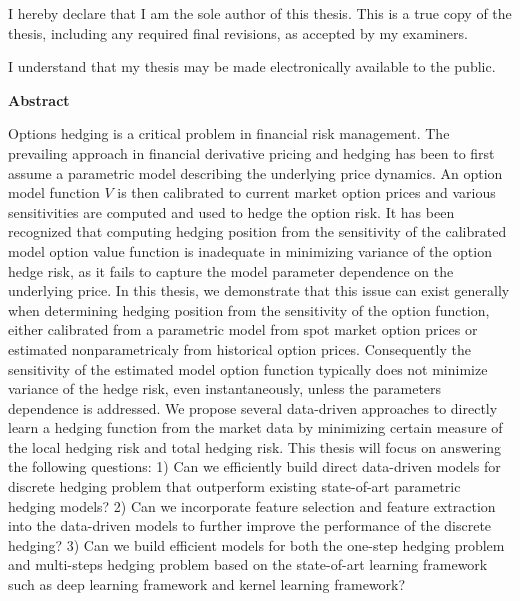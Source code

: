
\cleardoublepage

  \noindent
I hereby declare that I am the sole author of this thesis. This is a true copy of the thesis, including any required final revisions, as accepted by my examiners.

  \bigskip

  \noindent
I understand that my thesis may be made electronically available to the public.

\cleardoublepage


\begin{center}\textbf{Abstract}\end{center}
Options hedging is a critical problem in financial risk management. The prevailing approach in financial derivative pricing and hedging has been to first assume a parametric model describing the underlying price dynamics.  An option model function $V$ is then calibrated to current  market option prices and various sensitivities are computed and  used to hedge the option risk.  It has been recognized that computing hedging position from the sensitivity of the calibrated model option value function is inadequate in minimizing variance of the option hedge risk, as it fails to capture the model parameter dependence on the underlying price.
In this thesis, we demonstrate that this issue can exist generally when determining hedging position from the sensitivity of the option function, either  calibrated from a parametric model from spot market option prices or estimated nonparametricaly from historical option prices. Consequently the sensitivity of the estimated model option function typically does not minimize variance of the hedge risk, even instantaneously, unless the parameters dependence is addressed. We propose several data-driven approaches to directly learn a hedging function from the market data by minimizing certain measure of the local hedging risk and total hedging risk. This thesis will focus on answering the following questions: 1) Can we efficiently build direct data-driven models for discrete hedging problem that outperform existing state-of-art parametric hedging models? 2) Can we incorporate feature selection and feature extraction into the data-driven models to further improve the performance of the discrete hedging? 3) Can we build efficient models for both the one-step hedging problem and multi-steps hedging problem based on the state-of-art learning framework such as deep learning framework and kernel learning framework?

